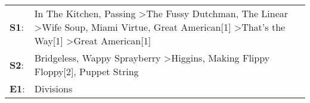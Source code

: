 \begin{supertabular}{p{0.03\textwidth}p{0.92\textwidth}}
 \textbf{S1}:  &  In The Kitchen\textsuperscript{}, \enspace Passing\textsuperscript{} \textgreater \enspace The Fussy Dutchman\textsuperscript{}, \enspace The Linear\textsuperscript{} \textgreater \enspace Wife Soup\textsuperscript{}, \enspace Miami Virtue\textsuperscript{}, \enspace Great American[1]\textsuperscript{} \textgreater \enspace That's the Way[1]\textsuperscript{} \textgreater \enspace Great American[1]\textsuperscript{}  \enspace  \\
 \textbf{S2}:  &                                                                                                                                                                                                              Bridgeless\textsuperscript{}, \enspace Wappy Sprayberry\textsuperscript{} \textgreater \enspace Higgins\textsuperscript{}, \enspace Making Flippy Floppy[2]\textsuperscript{}, \enspace Puppet String\textsuperscript{}  \enspace  \\
 \textbf{E1}:  &                                                                                                                                                                                                                                                                                                                                                                                                          Divisions\textsuperscript{}  \enspace  \\
\end{supertabular}
